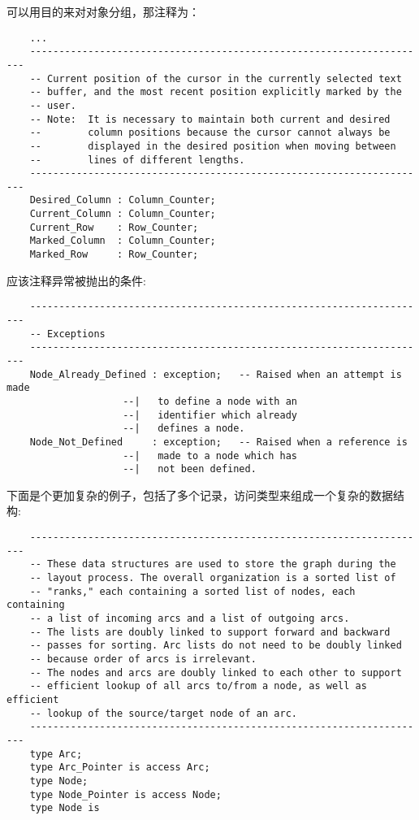 \begin{blockindent}
可以用目的来对对象分组，那注释为：
\begin{lstlisting}
    ...
    ---------------------------------------------------------------------
    -- Current position of the cursor in the currently selected text
    -- buffer, and the most recent position explicitly marked by the
    -- user.
    -- Note:  It is necessary to maintain both current and desired
    --        column positions because the cursor cannot always be
    --        displayed in the desired position when moving between
    --        lines of different lengths.
    ---------------------------------------------------------------------
    Desired_Column : Column_Counter;
    Current_Column : Column_Counter;
    Current_Row    : Row_Counter;
    Marked_Column  : Column_Counter;
    Marked_Row     : Row_Counter;
\end{lstlisting}
应该注释异常被抛出的条件:
\begin{lstlisting}
    ---------------------------------------------------------------------
    -- Exceptions
    ---------------------------------------------------------------------
    Node_Already_Defined : exception;   -- Raised when an attempt is made
					--|   to define a node with an
					--|   identifier which already
					--|   defines a node.
    Node_Not_Defined     : exception;   -- Raised when a reference is
					--|   made to a node which has
					--|   not been defined.
\end{lstlisting}
下面是个更加复杂的例子，包括了多个记录，访问类型来组成一个复杂的数据结构:
\begin{lstlisting}
    ---------------------------------------------------------------------
    -- These data structures are used to store the graph during the
    -- layout process. The overall organization is a sorted list of
    -- "ranks," each containing a sorted list of nodes, each containing
    -- a list of incoming arcs and a list of outgoing arcs.
    -- The lists are doubly linked to support forward and backward
    -- passes for sorting. Arc lists do not need to be doubly linked
    -- because order of arcs is irrelevant.
    -- The nodes and arcs are doubly linked to each other to support
    -- efficient lookup of all arcs to/from a node, as well as efficient
    -- lookup of the source/target node of an arc.
    ---------------------------------------------------------------------
    type Arc;
    type Arc_Pointer is access Arc;
    type Node;
    type Node_Pointer is access Node;
    type Node is

\end{lstlisting}
\end{blockindent}
